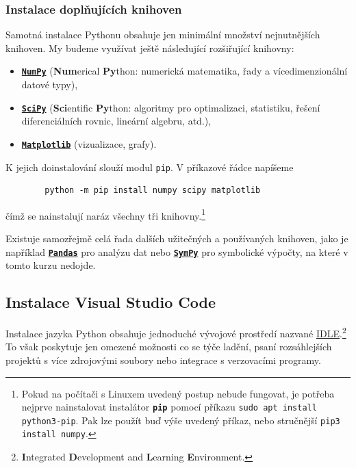 \documentclass[a4paper,11pt,twoside]{article}
\def\code#1{\textnormal{\texttt{#1}}}
\def\file#1{\textnormal{\textbf{\texttt{#1}}}}
\def\abbreviation#1{\textnormal{\textsc{#1}}}
\theoremstyle{red}
\theoremstyle{green}
\begin{document}
\subsubsection{Instalace doplňujících knihoven}
\label{sec:pip}
    Samotná instalace Pythonu obsahuje jen minimální množství nejnutnějších knihoven.
    My budeme využívat ještě následující rozšiřující knihovny:
    \begin{itemize}
        \item \file{\href{https://numpy.org}{NumPy}} ({\bf Num}erical {\bf Py}thon: numerická matematika, řady a vícedimenzionální datové typy),
        \item \file{\href{https://scipy.org}{SciPy}} ({\bf Sci}entific {\bf Py}thon: algoritmy pro optimalizaci, statistiku, řešení diferenciálních rovnic, lineární algebru, atd.),
        \item \file{\href{https://matplotlib.org}{Matplotlib}} (vizualizace, grafy).
    \end{itemize}
    K jejich doinstalování slouží modul \code{pip}.
    V příkazové řádce napíšeme
    \begin{lstlisting}
        python -m pip install numpy scipy matplotlib\end{lstlisting}
    čímž se nainstalují naráz všechny tři knihovny.\footnote{
        Pokud na počítači s Linuxem uvedený postup nebude fungovat, je potřeba nejprve nainstalovat instalátor \file{pip} pomocí příkazu \code{sudo apt install python3-pip}.
        Pak lze použít buď výše uvedený příkaz, nebo stručnější \code{pip3 install numpy}.
    }
    
    Existuje samozřejmě celá řada dalších užitečných a používaných knihoven, jako je například \file{\href{https://pandas.pydata.org/}{Pandas}} pro analýzu dat nebo \file{\href{https://www.sympy.org/}{SymPy}} pro symbolické výpočty, na které v tomto kurzu nedojde.

\subsection{Instalace Visual Studio Code}
    Instalace jazyka Python obsahuje jednoduché vývojové prostředí nazvané \abbreviation{\href{https://docs.python.org/3/library/idle.html}{IDLE}}.\footnote{
        {\bf I}ntegrated {\bf D}evelopment and {\bf L}earning {\bf E}nvironment.
    }
    To však poskytuje jen omezené možnosti co se týče ladění, psaní rozsáhlejších projektů s více zdrojovými soubory nebo integrace s verzovacími programy.
\end{document}
